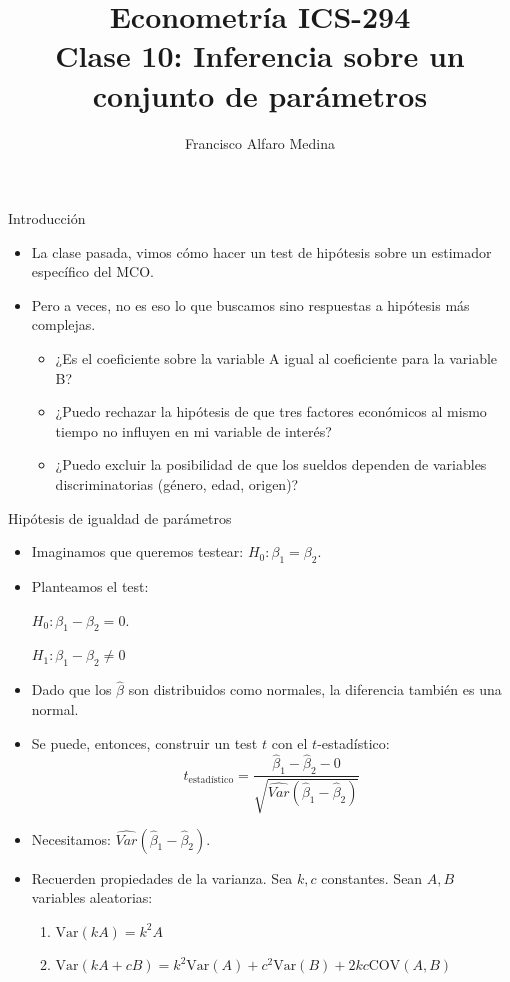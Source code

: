 \documentclass{beamer}
\title[ICS-162]{Econometría ICS-294\\ \small{Clase 10: Inferencia sobre un conjunto de parámetros}}
\author{Francisco Alfaro Medina}
\institute[USM]
{Universidad Técnica Federico Santa María\\ %
	\medskip
	\textit{} %
	
}
\date{}
\begin{document}
	
\begin{frame}
	\titlepage %


\end{frame}

\begin{frame}{Introducción}
    \begin{itemize}
        \item La clase pasada, vimos cómo hacer un test de hipótesis sobre un estimador específico del MCO.
        \item Pero a veces, no es eso lo que buscamos sino respuestas a hipótesis más complejas.
            \begin{itemize}
                \item ¿Es el coeficiente sobre la variable A igual al coeficiente para la variable B?
                \item ¿Puedo rechazar la hipótesis de que tres factores económicos al mismo tiempo no influyen en mi variable de interés?
                \item ¿Puedo excluir la posibilidad de que los sueldos dependen de variables discriminatorias (género, edad, origen)?
            \end{itemize}
      
    \end{itemize}
\end{frame}

\begin{frame}{Hipótesis de igualdad de parámetros}
    \begin{itemize}
        \item Imaginamos que queremos testear: $H_0: \beta_1 = \beta_2$. 
        \item Planteamos el test:
        
        $H_0: \beta_1 - \beta_2 = 0$.

        $H_1: \beta_1 - \beta_2 \neq 0$
        \item Dado que los $\hat{\beta}$ son distribuidos como normales, la diferencia también es una normal.
        \item Se puede, entonces, construir un test $t$ con el $t$-estadístico:
        \[t_{\text{estadístico}} = \frac{\hat{\beta}_1 - \hat{\beta}_2 - 0}{\sqrt{\hat{Var}(\hat{\beta}_1 - \hat{\beta}_2)}}\]
        \item Necesitamos: $\hat{Var}(\hat{\beta}_1 - \hat{\beta}_2)$.
        \item Recuerden propiedades de la varianza. Sea $k,c$ constantes. Sean $A, B$ variables aleatorias:
        \begin{enumerate}
            \item $\text{Var}(kA) = k^2A$
            \item $\text{Var}(kA + cB) = k^2\text{Var}(A) + c^2\text{Var}(B) + 2kc\text{COV}(A, B)$
        \end{enumerate}
    \end{itemize}
\end{frame}
\end{document}
